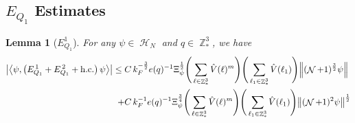 \documentclass[sn-mathphys, Numbered ,a4paper]{sn-jnl}%
\DeclareMathOperator{\Z}{\mathbb{Z}}
\DeclareMathOperator{\HH}{\mathcal{H}}
\DeclareMathOperator{\NN}{\mathcal{N}}
\newcommand{\half}{\frac{1}{2}}
\newcommand{\eva}[1]{\left\langle #1 \right\rangle}
\theoremstyle{plain}
\newtheorem{lemma}[theorem]{Lemma}
\theoremstyle{definition}
\theoremstyle{remark}
\theoremstyle{plain}
\theoremstyle{definition}
\theoremstyle{remark}
\begin{document}
 \subsection{$E_{Q_1}$ Estimates}
\begin{lemma}[$E_{Q_1}^{1}$]\label{lem:EQ111}
For any $\psi \in \HH_N$ and $q \in \Z^3_*$, we have
\begin{alignat}{2}
     \abs{\eva{\psi,\left(E^{\,1}_{Q_1}+E^{\,2}_{Q_1}+\mathrm{h.c.}\right) \psi }}\nonumber
     \leq \; &C\,  k_{F}^{-\frac{3}{2}} e(q)^{-1} \Xi_{\psi}^\half \Bigg(\sum\limits_{\ell \in \Z^3_*} \hat{V}(\ell)^m\Bigg)\Bigg( \sum\limits_{\ell_1 \in \Z^3_*} \hat{V}(\ell_1) \Bigg) \norm { (\NN+1)^{\frac{3}{2}} \psi }\\
     \;+ &C\, k_{F}^{-1} e(q)^{-1} \Xi_{\psi}^{\frac{3}{4}} \Bigg(\sum\limits_{\ell \in \Z^3_*} \hat{V}(\ell)^m\Bigg) \Bigg(\sum\limits_{\ell_1 \in \Z^3_*} \hat{V}(\ell_1) \Bigg)  \norm{ (\NN+1)^2\psi}^\half \label{eq:estEQ111}
\end{alignat}
\end{lemma}
\end{document}
